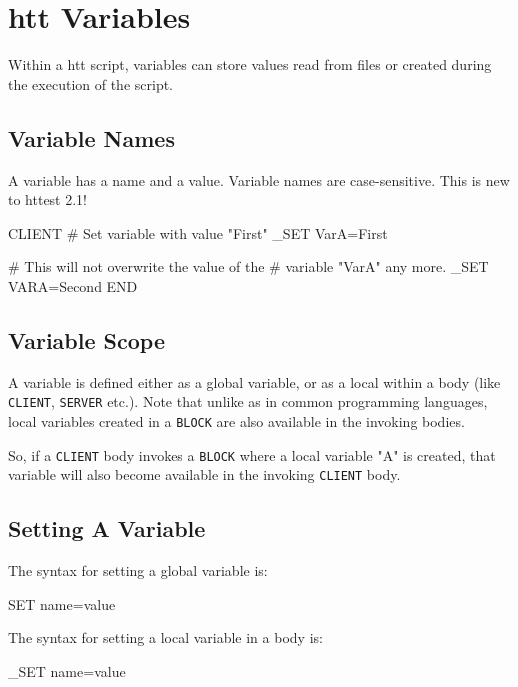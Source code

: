 \chapter{htt Variables}
\label{chap:variables}

Within a htt script, variables can store values read from files 
or created during the execution of the script.

\section{Variable Names}

A variable has a name and a value. Variable names are 
case-sensitive. This is new to httest 2.1!

\begin{usplisting}
    CLIENT
    # Set variable with value "First"
    _SET VarA=First
    
    # This will not overwrite the value of the 
    # variable "VarA" any more.
    _SET VARA=Second
    END
\end{usplisting}

\section{Variable Scope}

A variable is defined either as a global variable, or as a local within 
a body (like \texttt{CLIENT}, \texttt{SERVER} etc.). Note that unlike as in  
common programming languages, local variables created in a \texttt{BLOCK} 
are also available in the invoking bodies.

So, if a \texttt{CLIENT} body invokes a \texttt{BLOCK} where a local variable "A" 
is created, that variable will also become available in the invoking \texttt{CLIENT} 
body.

\newpage
\section{Setting A Variable} 

The syntax for setting a global variable is:

\begin{usplisting}
    SET name=value
\end{usplisting}

The syntax for setting a local variable in a body is:

\begin{usplisting}
    _SET name=value
\end{usplisting}

